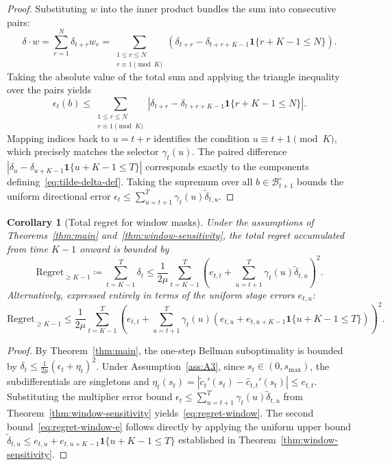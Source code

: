 \documentclass[11pt]{article}
\newtheorem{corollary}{Corollary}[section]
\newcommand{\1}{\mathbf{1}}
\newcommand{\ind}[1]{\mathbf{1}\{#1\}}
\newcommand{\eqdef}{\coloneqq}
\newcommand{\modu}[1]{\left|#1\right|}
\newcommand{\bcal}{\mathcal{B}}
\begin{document}
\begin{proof}
  Substituting $w$ into the inner product bundles the sum into consecutive pairs:
  \begin{equation*}
    \delta \cdot w = \sum_{r=1}^{N} \delta_{t+r} w_r = \sum_{\substack{1 \le r \le N \\ r \equiv 1 \pmod{K}}} \left( \delta_{t+r} - \delta_{t+r+K-1} \ind{r+K-1 \le N} \right).
  \end{equation*}
  Taking the absolute value of the total sum and applying the triangle inequality over the pairs yields
  \begin{equation*}
    \epsilon_t(b) \le \sum_{\substack{1 \le r \le N \\ r \equiv 1 \pmod{K}}} \modu{ \delta_{t+r} - \delta_{t+r+K-1} \ind{r+K-1 \le N} }.
  \end{equation*}
  Mapping indices back to $u = t+r$ identifies the condition $u \equiv t+1 \pmod{K}$, which precisely matches the selector $\gamma_t(u)$.
  The paired difference $\modu{\delta_u - \delta_{u+K-1} \ind{u+K-1 \le T}}$ corresponds exactly to the components defining~\eqref{eq:tilde-delta-def}.
  Taking the supremum over all $b \in \bcal_{t+1}^\circ$ bounds the uniform directional error $\epsilon_t \le \sum_{u=t+1}^{T} \gamma_t(u) \tilde{\delta}_{t,u}$.
\end{proof}

\begin{corollary}[Total regret for window masks]
  \label{cor:regret-window}%
  Under the assumptions of Theorems~\ref{thm:main} and~\ref{thm:window-sensitivity}, the total regret accumulated from time $K-1$ onward is bounded by
  \begin{equation}
    \label{eq:regret-window}
    \mathrm{Regret}_{\geq K-1}
    \eqdef \sum_{t=K-1}^{T} \delta_t
    \leq \frac{1}{2\mu}\sum_{t=K-1}^{T} \left( e_{t,t} + \sum_{u=t+1}^{T} \gamma_t(u) \tilde{\delta}_{t,u} \right)^2.
  \end{equation}
  Alternatively, expressed entirely in terms of the uniform stage errors $e_{t,u}$:
  \begin{equation}
    \label{eq:regret-window-e}
    \mathrm{Regret}_{\geq K-1}
    \leq \frac{1}{2\mu}\sum_{t=K-1}^{T} \left( e_{t,t} + \sum_{u=t+1}^{T} \gamma_t(u) \left(e_{t,u} + e_{t,u+K-1}\ind{u+K-1 \le T}\right) \right)^2.
  \end{equation}
\end{corollary}

\begin{proof}
  By Theorem~\ref{thm:main}, the one-step Bellman suboptimality is bounded by $\delta_t \leq \frac{1}{2\mu}(\epsilon_t + \eta_t)^2$.
  Under Assumption~\ref{ass:A3}, since $s_t \in (0, s_{\max})$, the subdifferentials are singletons and $\eta_t(s_t) = |\tilde{c}_t'(s_t) - \hat{c}_{t,t}'(s_t)| \le e_{t,t}$.
  Substituting the multiplier error bound $\epsilon_t \leq \sum_{u=t+1}^{T} \gamma_t(u) \tilde{\delta}_{t,u}$ from Theorem~\ref{thm:window-sensitivity} yields~\eqref{eq:regret-window}.
  The second bound~\eqref{eq:regret-window-e} follows directly by applying the uniform upper bound $\tilde{\delta}_{t,u} \le e_{t,u} + e_{t,u+K-1}\ind{u+K-1 \le T}$ established in Theorem~\ref{thm:window-sensitivity}.
\end{proof}

\end{document}
